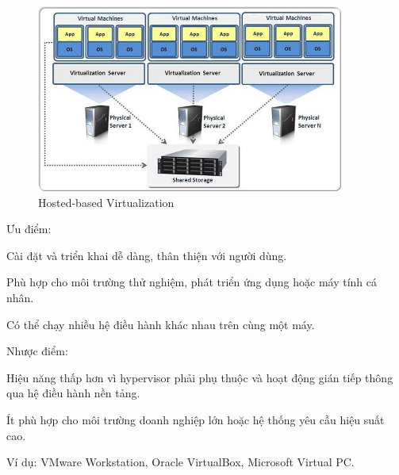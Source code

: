 \begin{figure}[H] %
    \centering
    \includegraphics[width=0.9\textwidth]{Oracle_cloud/Hosted-based-Virtualization.jpg}
    \caption{Hosted-based Virtualization}
    \label{fig:cloud_intro}
\end{figure}

\begin{myitem}
\item Ưu điểm:
  \begin{mysubitem}
  \item Cài đặt và triển khai dễ dàng, thân thiện với người dùng.
  
  \item Phù hợp cho môi trường thử nghiệm, phát triển ứng dụng hoặc máy tính cá nhân.
  
  \item Có thể chạy nhiều hệ điều hành khác nhau trên cùng một máy.
  
  \end{mysubitem}

\item Nhược điểm:

  \begin{mysubitem}
  \item Hiệu năng thấp hơn vì hypervisor phải phụ thuộc và hoạt động gián tiếp thông qua hệ điều hành nền tảng.
  
  \item Ít phù hợp cho môi trường doanh nghiệp lớn hoặc hệ thống yêu cầu hiệu suất cao.

  \end{mysubitem}

\item Ví dụ: VMware Workstation, Oracle VirtualBox, Microsoft Virtual PC.
\end{myitem}

